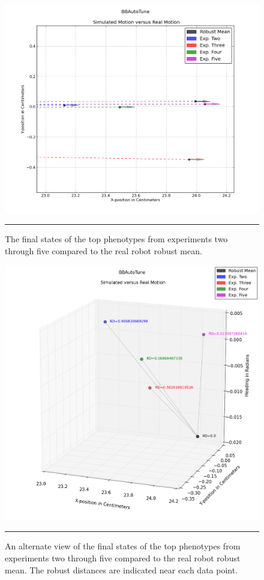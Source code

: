 \begin{figure}[htbp]
\centering
\includegraphics[width=6in]{../Figures/Chapter4/simu_vs_real_line.png}
\rule{35em}{0.5pt}
\caption[Simulated versus Real Motion Line Plot]{The final states of the top phenotypes from experiments two through five compared to the real robot robust mean.}
\label{fig:simu_vs_real_line}
\end{figure}

\begin{figure}[htbp]
\centering
\includegraphics[width=5in]{../Figures/Chapter4/simu_vs_real_3d.png}
\rule{35em}{0.5pt}
\caption[Simulated versus Real Motion 3D Plot]{An alternate view of the final states of the top phenotypes from experiments two through five compared to the real robot robust mean. The robust distances are indicated near each data point.}
\label{fig:simu_vs_real_3d}
\end{figure}

